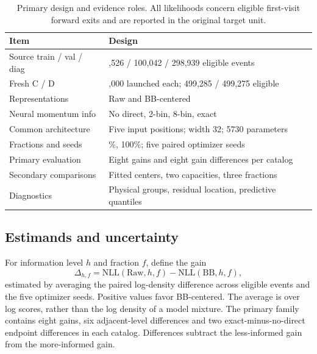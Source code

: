 \documentclass[twocolumn,epjc3]{svjour3}
\newcommand{\raw}{\mathrm{Raw}}
\begin{document}
\begin{table}[t]
\centering
\setlength{\tabcolsep}{4pt}
\caption{Primary design and evidence roles. All likelihoods concern eligible
first-visit forward exits and are reported in the original target unit.}
\label{tab:protocol}
\begin{tabular}{>{\raggedright\arraybackslash}p{}>{\raggedright\arraybackslash}p{}}
\toprule
Item & Design \\
\midrule
Source train / val / diag & 599,526 / 100,042 / 298,939 eligible events \\
Fresh C / D & 500,000 launched each; 499,285 / 499,275 eligible \\
Representations & Raw and BB-centered \\
Neural momentum info & No direct, 2-bin, 8-bin, exact \\
Common architecture & Five input positions; width 32; 5730 parameters \\
Fractions and seeds & 10\%, 100\%; five paired optimizer seeds \\
Primary evaluation & Eight gains and eight gain differences per catalog \\
Secondary comparisons & Fitted centers, two capacities, three fractions \\
Diagnostics & Physical groups, residual location, predictive quantiles \\
\bottomrule
\end{tabular}
\end{table}

\subsection{Estimands and uncertainty}
\label{sec:information_uncertainty}

For information level $h$ and fraction $f$, define the gain
\begin{equation}
 \Delta_{h,f}=\mathrm{NLL}(\raw,h,f)-\mathrm{NLL}(\mathrm{BB},h,f),
 \label{eq:contrast}
\end{equation}
estimated by averaging the paired log-density difference across eligible
events and the five optimizer seeds. Positive values favor BB-centered.
The average is over log scores, rather than the log density of a model mixture.
The primary family contains eight gains, six adjacent-level differences and
two exact-minus-no-direct endpoint differences in each catalog. Differences
subtract the less-informed gain from the more-informed gain.
\end{document}
